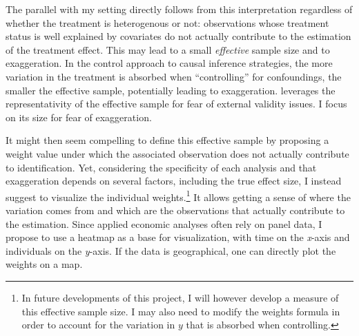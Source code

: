 \documentclass[usletter, 12pt]{article}
\begin{document}
				The parallel with my setting directly follows from this interpretation regardless of whether the treatment is heterogenous or not: observations whose treatment status is well explained by covariates do not actually contribute to the estimation of the treatment effect. This may lead to a small \textit{effective} sample size and to exaggeration. In the control approach to causal inference strategies, the more variation in the treatment is absorbed when ``controlling'' for confoundings, the smaller the effective sample, potentially leading to exaggeration. \cite{aronow_does_2016} leverages the representativity of the effective sample for fear of external validity issues. I focus on its size for fear of exaggeration.
				
				It might then seem compelling to define this effective sample by proposing a weight value under which the associated observation does not actually contribute to  identification. Yet, considering the specificity of each analysis and that exaggeration depends on several factors, including the true effect size, I instead suggest to visualize the individual weights.\footnote{In future developments of this project, I will however develop a measure of this effective sample size. I may also need to modify the weights formula in order to account for the variation in $y$ that is absorbed when controlling.}  It allows getting a sense of where the variation comes from and which are the observations that actually contribute to the estimation. Since applied economic analyses often rely on panel data, I propose to use a heatmap as a base for visualization, with time on the \textit{x}-axis and individuals on the \textit{y}-axis. If the data is geographical, one can directly plot the weights on a map.%
				
				
				
\end{document}
